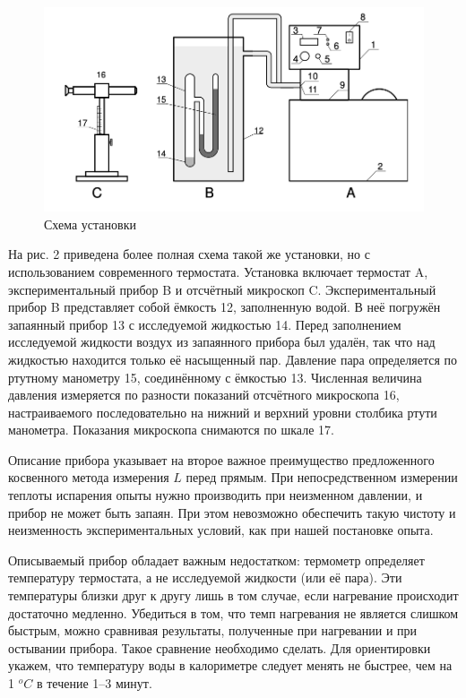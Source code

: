 \documentclass[12pt,a4paper]{article}
\begin{document}
\begin{figure}[htp]
    \centering
    \includegraphics[scale=0.7]{scheme2.jpeg}
    \caption{Схема установки}
\end{figure}

На рис. 2 приведена более полная схема такой же установки, но с использованием современного термостата. 
Установка включает термостат A, экспериментальный прибор B и отсчётный микроскоп C. 
Экспериментальный прибор B представляет собой ёмкость 12, заполненную водой. 
В неё погружён запаянный прибор 13 с исследуемой жидкостью 14. 
Перед заполнением исследуемой жидкости воздух из запаянного прибора был удалён, так что над жидкостью находится только её насыщенный пар. 
Давление пара определяется по ртутному манометру 15, соединённому с ёмкостью 13. 
Численная величина давления измеряется по разности показаний отсчётного микроскопа 16, настраиваемого последовательно на нижний и верхний уровни столбика ртути манометра. 
Показания микроскопа снимаются по шкале 17.

Описание прибора указывает на второе важное преимущество предложенного косвенного метода измерения $L$ перед прямым.
При непосредственном измерении теплоты испарения опыты нужно производить при неизменном давлении, и прибор не может быть запаян. 
При этом невозможно обеспечить такую чистоту и неизменность экспериментальных условий, как при нашей постановке опыта.

Описываемый прибор обладает важным недостатком: термометр определяет температуру термостата, а не исследуемой жидкости (или её пара). 
Эти температуры близки друг к другу лишь в том случае, если нагревание происходит достаточно медленно. 
Убедиться в том, что темп нагревания не является слишком быстрым, можно сравнивая результаты, полученные при нагревании и при остывании прибора. 
Такое сравнение необходимо сделать. 
Для ориентировки укажем, что температуру воды в калориметре следует менять не быстрее, чем на 1 $^oC$ в течение 1–3 минут.
\end{document}
